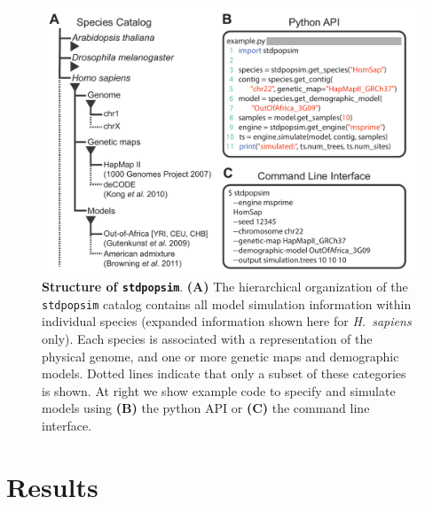 \documentclass[12pt,halfline,a4paper]{ouparticle}
\newcommand{\stdpopsim}{\texttt{stdpopsim}\xspace}
\begin{document}
\begin{figure}[t]
\begin{center}
\includegraphics[width=0.7\linewidth]{display_items/Figure1.pdf}
    \caption{\textbf{Structure of \stdpopsim}. \textbf{(A)} The
hierarchical organization of the \stdpopsim catalog contains all model simulation information
within individual species (expanded information shown here for \textit{H.~sapiens} only).
Each species is associated with a representation of the physical genome, and one or more genetic maps and demographic models.
Dotted lines indicate that only a subset of these categories is shown.
At right we show example code to specify
and simulate models using \textbf{(B)} the python API or \textbf{(C)} the command line interface.
    }
\label{fig:cartoon}
\end{center}
\end{figure}

\section*{Results}
\end{document}
